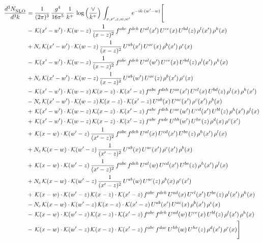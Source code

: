 \documentclass[9pt]{article}
\numberwithin{equation}{section}
\begin{document}
\begin{align}
    \frac{d^{3}N_{\rm NLO}^{\rm}}{d^{3}k}  & = \frac{1}{(2\pi)^{3}}\,\frac{g^{4}}{16\pi^{5}}\,\frac{1}{k^{+}}\,\log{\left(\frac{\vee}{k^{+}}\right)}\, \int_{x,x',z,w,w'}e^{-ik\cdot(w'-w)}\Bigg[\notag\\ &
    -\,\mathcal{K}(x'-w')\cdot\mathcal{K}(w-z)\,\frac{1}{(x-z)^{2}}\,f^{abc}\,f^{deh}\,U^{al}(x')\,U^{ce}(x)\,U^{bd}(z)\,\rho^{l}(x')\,\rho^{h}(x)\notag \\ 
&+N_{c}\,\mathcal{K}(x'-w')\cdot\mathcal{K}(w-z)\,\frac{1}{(x-z)^{2}}\,U^{ab}(x')\,U^{ac}(x)\,\rho^{b}(x')\,\rho^{c}(x)\notag \\ 
&-\,\mathcal{K}(x'-w')\cdot\mathcal{K}(w-z)\,\frac{1}{(x-z)^{2}}\,f^{abc}\,f^{deh}\,U^{al}(w')\,U^{ce}(x)\,U^{bd}(z)\,\rho^{l}(x')\,\rho^{h}(x)\notag \\ 
&+N_{c}\,\mathcal{K}(x'-w')\cdot\mathcal{K}(w-z)\,\frac{1}{(x-z)^{2}}\,U^{ab}(w')\,U^{ac}(z)\,\rho^{b}(x')\,\rho^{c}(x)\notag \\ 
&-\,\mathcal{K}(x'-w')\cdot\mathcal{K}(w-z)\,\mathcal{K}(x-z)\cdot\mathcal{K}(x'-z)\,f^{abc}\,f^{deh}\,U^{ae}(x')\,U^{cl}(x)\,U^{bd}(z)\,\rho^{l}(x)\,\rho^{h}(x')\notag \\ 
&-N_{c}\,\mathcal{K}(x'-w')\cdot\mathcal{K}(w-z)\,\mathcal{K}(x-z)\cdot\mathcal{K}(x'-z)\,U^{ab}(x)\,U^{ac}(x')\,\rho^{c}(x')\,\rho^{b}(x)\notag \\ 
&+\,\mathcal{K}(x'-w')\cdot\mathcal{K}(w-z)\,\mathcal{K}(x-z)\cdot\mathcal{K}(x'-z)\,f^{abc}\,f^{deh}\,U^{ae}(w')\,U^{cd}(x')\,U^{bl}(z)\,\rho^{h}(x')\,\rho^{l}(x)\notag \\ 
&+\,\mathcal{K}(x'-w')\cdot\mathcal{K}(w-z)\,\mathcal{K}(x-z)\cdot\mathcal{K}(x'-z)\,f^{abc}\,f^{ade}\,U^{hb}(w')\,U^{he}(z)\,\rho^{d}(x)\,\rho^{c}(x')\notag \\ 
&+\,\mathcal{K}(x-w)\cdot\mathcal{K}(w'-z)\,\frac{1}{(x'-z)^{2}}\,f^{abc}\,f^{deh}\,U^{al}(x)\,U^{cd}(x')\,U^{be}(z)\,\rho^{h}(x')\,\rho^{l}(x)\notag \\ 
&+N_{c}\,\mathcal{K}(x-w)\cdot\mathcal{K}(w'-z)\,\frac{1}{(x'-z)^{2}}\,U^{ab}(x)\,U^{ac}(x')\,\rho^{c}(x')\,\rho^{b}(x)\notag \\ 
&+\,\mathcal{K}(x-w)\cdot\mathcal{K}(w'-z)\,\frac{1}{(x'-z)^{2}}\,f^{abc}\,f^{deh}\,U^{al}(w)\,U^{cd}(x')\,U^{be}(z)\,\rho^{h}(x')\,\rho^{l}(x)\notag \\ 
&+N_{c}\,\mathcal{K}(x-w)\cdot\mathcal{K}(w'-z)\,\frac{1}{(x'-z)^{2}}\,U^{ab}(w)\,U^{ac}(z)\,\rho^{b}(x)\,\rho^{c}(x')\notag \\ 
&+\,\mathcal{K}(x-w)\cdot\mathcal{K}(w'-z)\,\mathcal{K}(x-z)\cdot\mathcal{K}(x'-z)\,f^{abc}\,f^{deh}\,U^{ad}(x)\,U^{cl}(x')\,U^{be}(z)\,\rho^{l}(x')\,\rho^{h}(x)\notag \\ 
&-N_{c}\,\mathcal{K}(x-w)\cdot\mathcal{K}(w'-z)\,\mathcal{K}(x-z)\cdot\mathcal{K}(x'-z)\,U^{ab}(x')\,U^{ac}(x)\,\rho^{b}(x')\,\rho^{c}(x)\notag \\ 
&-\,\mathcal{K}(x-w)\cdot\mathcal{K}(w'-z)\,\mathcal{K}(x-z)\cdot\mathcal{K}(x'-z)\,f^{abc}\,f^{deh}\,U^{ad}(w)\,U^{ce}(x)\,U^{bl}(z)\,\rho^{l}(x')\,\rho^{h}(x)\notag \\ 
&-\,\mathcal{K}(x-w)\cdot\mathcal{K}(w'-z)\,\mathcal{K}(x-z)\cdot\mathcal{K}(x'-z)\,f^{abc}\,f^{dae}\,U^{hb}(w)\,U^{he}(z)\,\rho^{d}(x')\,\rho^{c}(x)\Bigg]
\end{align}
\end{document}
